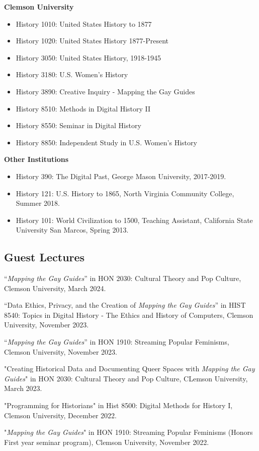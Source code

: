 \documentclass[11pt]{article}
\begin{document}
\textbf{Clemson University}
\begin{itemize}
  \itemsep0em 
  \item History 1010: United States History to 1877
  \item History 1020: United States History 1877-Present
  \item History 3050: United States History, 1918-1945
  \item History 3180: U.S. Women's History
  \item History 3890: Creative Inquiry - Mapping the Gay Guides
  \item History 8510: Methods in Digital History II
  \item History 8550: Seminar in Digital History
  \item History 8850: Independent Study in U.S. Women's History
\end{itemize}
\textbf{Other Institutions}
\begin{itemize}
  \itemsep0em 
  \item History 390: The Digital Past, George Mason University, 2017-2019.
  \item History 121: U.S. History to 1865, North Virginia Community College, Summer 2018.
  \item History 101: World Civilization to 1500, Teaching Assistant, California State University San Marcos, Spring 2013.
\end{itemize}

\subsection{Guest Lectures}
``\emph{Mapping the Gay Guides}'' in HON 2030: Cultural Theory and Pop Culture, Clemson University, March 2024.

``Data Ethics, Privacy, and the Creation of \emph{Mapping the Gay Guides}'' in HIST 8540: Topics in Digital History - The Ethics and History of Computers, Clemson University, November 2023.

``\emph{Mapping the Gay Guides}'' in HON 1910: Streaming Popular Feminisms, Clemson University, November 2023.

"Creating Historical Data and Documenting Queer Spaces with \emph{Mapping the Gay Guides}" in HON 2030: Cultural Theory and Pop Culture, CLemson University, March 2023.

"Programming for Historians" in Hist 8500: Digital Methods for History I, Clemson University, December 2022.

"\emph{Mapping the Gay Guides}" in HON 1910: Streaming Popular Feminisms (Honors First year seminar program), Clemson University, November 2022. 
\end{document}

